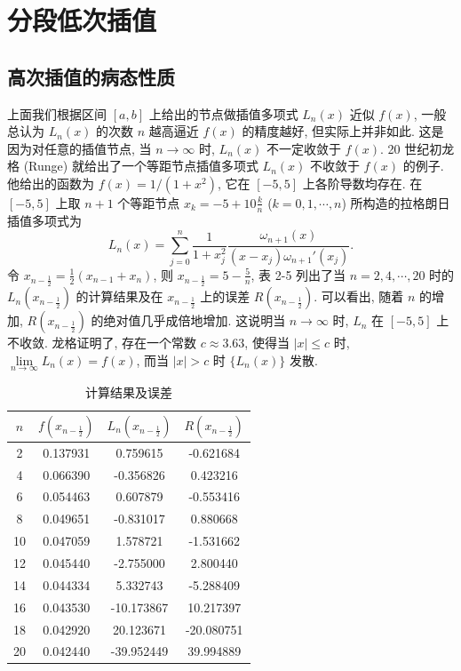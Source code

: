 \documentclass[../../main.tex]{subfiles}%
\begin{document}
\section{分段低次插值}

\subsection{高次插值的病态性质}\label{高次插值导致的龙格现象}

上面我们根据区间 $[a, b]$ 上给出的节点做插值多项式 $L_n(x)$ 近似 $f(x)$, 一般总认为 $L_n(x)$ 的次数 $n$ 越高逼近 $f(x)$ 的精度越好, 但实际上并非如此. 这是因为对任意的插值节点, 当 $n \to \infty$ 时, $L_n(x)$ 不一定收敛于 $f(x)$. 20 世纪初龙格 (Runge) 就给出了一个等距节点插值多项式 $L_n(x)$ 不收敛于 $f(x)$ 的例子. 他给出的函数为 $f(x) = 1/(1 + x^2)$, 它在 $[-5, 5]$ 上各阶导数均存在. 在 $[-5, 5]$ 上取 $n + 1$ 个等距节点 $x_k = -5 + 10 \frac{k}{n}$ ($k = 0, 1, \cdots, n$) 所构造的拉格朗日插值多项式为
\[
L_n(x) = \sum_{j=0}^n \frac{1}{1 + x_j^2} \frac{\omega_{n+1}(x)}{(x - x_j) \omega_{n+1}'(x_j)}.
\]
令 $x_{n - \frac{1}{2}} = \frac{1}{2}(x_{n - 1} + x_n)$, 则 $x_{n - \frac{1}{2}} = 5 - \frac{5}{n}$, 表 2-5 列出了当 $n = 2, 4, \cdots, 20$ 时的 $L_n(x_{n - \frac{1}{2}})$ 的计算结果及在 $x_{n - \frac{1}{2}}$ 上的误差 $R(x_{n - \frac{1}{2}})$. 可以看出, 随着 $n$ 的增加, $R(x_{n - \frac{1}{2}})$ 的绝对值几乎成倍地增加. 这说明当 $n \to \infty$ 时, $L_n$ 在 $[-5, 5]$ 上不收敛. 龙格证明了, 存在一个常数 $c \approx 3.63$, 使得当 $|x| \leqslant c$ 时, $\lim\limits_{n \to \infty} L_n(x) = f(x)$, 而当 $|x| > c$ 时 $\{L_n(x)\}$ 发散.
\begin{table}[H]
\centering
\caption{计算结果及误差}
\begin{tabular}{c|c|c|c}
\toprule
$n$ & $f(x_{n - \frac{1}{2}})$ & $L_n(x_{n - \frac{1}{2}})$ & $R(x_{n - \frac{1}{2}})$ \\
\midrule
2  & 0.137931 & 0.759615   & -0.621684  \\
4  & 0.066390 & -0.356826  & 0.423216   \\
6  & 0.054463 & 0.607879   & -0.553416  \\
8  & 0.049651 & -0.831017  & 0.880668   \\
10 & 0.047059 & 1.578721   & -1.531662  \\
12 & 0.045440 & -2.755000  & 2.800440   \\
14 & 0.044334 & 5.332743   & -5.288409 \\
16 & 0.043530 & -10.173867 & 10.217397  \\
18 & 0.042920 & 20.123671  & -20.080751 \\
20 & 0.042440 & -39.952449 & 39.994889  \\
\bottomrule
\end{tabular}
\end{table}
\end{document}
